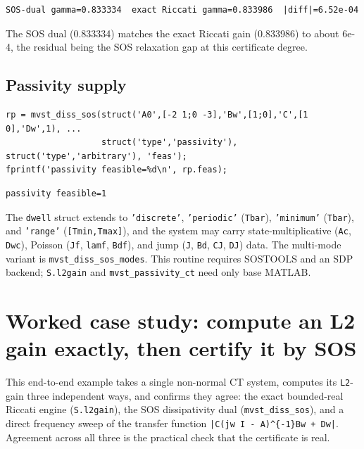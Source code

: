 \documentclass[11pt,oneside]{report}
\newcommand{\code}[1]{\texttt{#1}}
\begin{document}
\begin{lstlisting}[style=outputstyle]
SOS-dual gamma=0.833334  exact Riccati gamma=0.833986  |diff|=6.52e-04
\end{lstlisting}

The SOS dual (0.833334) matches the exact Riccati gain (0.833986) to about
6e-4, the residual being the SOS relaxation gap at this certificate degree.

\hypertarget{passivity-supply}{%
\subsection{Passivity supply}\label{passivity-supply}}

\begin{lstlisting}[style=matlabstyle]
rp = mvst_diss_sos(struct('A0',[-2 1;0 -3],'Bw',[1;0],'C',[1 0],'Dw',1), ...
                   struct('type','passivity'), struct('type','arbitrary'), 'feas');
fprintf('passivity feasible=%d\n', rp.feas);
\end{lstlisting}

\begin{lstlisting}[style=outputstyle]
passivity feasible=1
\end{lstlisting}

The \code{dwell} struct extends to \code{'discrete'}, \code{'periodic'} (\code{Tbar}), \code{'minimum'}
(\code{Tbar}), and \code{'range'} (\code{[Tmin,Tmax]}), and the system may carry
state-multiplicative (\code{Ac}, \code{Dwc}), Poisson (\code{Jf}, \code{lamf}, \code{Bdf}), and jump
(\code{J}, \code{Bd}, \code{CJ}, \code{DJ}) data. The multi-mode variant is \code{mvst\_diss\_sos\_modes}.
This routine requires SOSTOOLS and an SDP backend; \code{S.l2gain} and
\code{mvst\_passivity\_ct} need only base MATLAB.

\hypertarget{worked-case-study-compute-an-l2-gain-exactly-then-certify-it-by-sos}{%
\section{Worked case study: compute an L2 gain exactly, then certify it by SOS}\label{worked-case-study-compute-an-l2-gain-exactly-then-certify-it-by-sos}}

This end-to-end example takes a single non-normal CT system, computes its
\code{L2}-gain three independent ways, and confirms they agree: the exact
bounded-real Riccati engine (\code{S.l2gain}), the SOS dissipativity dual
(\code{mvst\_diss\_sos}), and a direct frequency sweep of the transfer function
\code{|C(jw I - A)\^{}\{-1\}Bw + Dw|}. Agreement across all three is the practical check
that the certificate is real.
\end{document}
